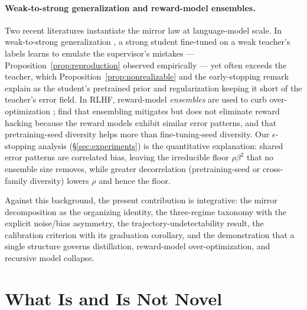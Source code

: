\documentclass[10pt]{article} %
\theoremstyle{plain}
\theoremstyle{remark}
\begin{document}
\paragraph{Weak-to-strong generalization and reward-model ensembles.} Two recent literatures instantiate the mirror law at language-model scale. In weak-to-strong generalization \citep{burns2023}, a strong student fine-tuned on a weak teacher's labels learns to emulate the supervisor's mistakes --- Proposition~\ref{prop:reproduction} observed empirically --- yet often exceeds the teacher, which Proposition~\ref{prop:nonrealizable} and the early-stopping remark explain as the student's pretrained prior and regularization keeping it short of the teacher's error field. In RLHF, reward-model \emph{ensembles} are used to curb over-optimization \citep{coste2023,rame2024warm}; \citet{eisenstein2023} find that ensembling mitigates but does not eliminate reward hacking because the reward models exhibit similar error patterns, and that pretraining-seed diversity helps more than fine-tuning-seed diversity. Our $\epsilon$-stopping analysis (\S\ref{sec:experiments}) is the quantitative explanation: shared error patterns are correlated bias, leaving the irreducible floor $\rho\beta^2$ that no ensemble size removes, while greater decorrelation (pretraining-seed or cross-family diversity) lowers $\rho$ and hence the floor.

Against this background, the present contribution is integrative: the mirror decomposition as the organizing identity, the three-regime taxonomy with the explicit noise/bias asymmetry, the trajectory-undetectability result, the calibration criterion with its graduation corollary, and the demonstration that a single structure governs distillation, reward-model over-optimization, and recursive model collapse.

\section{What Is and Is Not Novel}
\label{sec:novelty}
\end{document}
